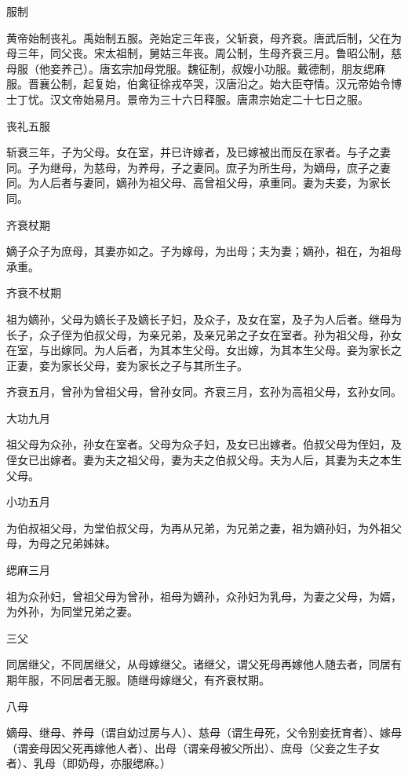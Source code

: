 \documentclass[a4paper,12pt,UTF8,twoside]{ctexbook}
\begin{document}
    服制
    
    黄帝始制丧礼。禹始制五服。尧始定三年丧，父斩衰，母齐衰。唐武后制，父在为母三年，同父丧。宋太祖制，舅姑三年丧。周公制，生母齐衰三月。鲁昭公制，慈母服（他妾养己）。唐玄宗加母党服。魏征制，叔嫂小功服。戴德制，朋友缌麻服。晋襄公制，起复始，伯禽征徐戎卒哭，汉唐沿之。始大臣夺情。汉元帝始令博士丁忧。汉文帝始易月。景帝为三十六日释服。唐肃宗始定二十七日之服。
    
    丧礼五服
    
    斩衰三年，子为父母。女在室，并已许嫁者，及已嫁被出而反在家者。与子之妻同。子为继母，为慈母，为养母，子之妻同。庶子为所生母，为嫡母，庶子之妻同。为人后者与妻同，嫡孙为祖父母、高曾祖父母，承重同。妻为夫妾，为家长同。
    
    齐衰杖期
    
    嫡子众子为庶母，其妻亦如之。子为嫁母，为出母；夫为妻；嫡孙，祖在，为祖母承重。
    
    齐衰不杖期
    
    祖为嫡孙，父母为嫡长子及嫡长子妇，及众子，及女在室，及子为人后者。继母为长子，众子侄为伯叔父母，为亲兄弟，及亲兄弟之子女在室者。孙为祖父母，孙女在室，与出嫁同。为人后者，为其本生父母。女出嫁，为其本生父母。妾为家长之正妻，妾为家长父母，妾为家长之子与其所生子。
    
    齐衰五月，曾孙为曾祖父母，曾孙女同。齐衰三月，玄孙为高祖父母，玄孙女同。
    
    大功九月
    
    祖父母为众孙，孙女在室者。父母为众子妇，及女已出嫁者。伯叔父母为侄妇，及侄女已出嫁者。妻为夫之祖父母，妻为夫之伯叔父母。夫为人后，其妻为夫之本生父母。
    
    小功五月
    
    为伯叔祖父母，为堂伯叔父母，为再从兄弟，为兄弟之妻，祖为嫡孙妇，为外祖父母，为母之兄弟姊妹。
    
    缌麻三月
    
    祖为众孙妇，曾祖父母为曾孙，祖母为嫡孙，众孙妇为乳母，为妻之父母，为婿，为外孙，为同堂兄弟之妻。
    
    三父
    
    同居继父，不同居继父，从母嫁继父。诸继父，谓父死母再嫁他人随去者，同居有期年服，不同居者无服。随继母嫁继父，有齐衰杖期。
    
    八母
    
    嫡母、继母、养母（谓自幼过房与人）、慈母（谓生母死，父令别妾抚育者）、嫁母（谓妾母因父死再嫁他人者）、出母（谓亲母被父所出）、庶母（父妾之生子女者）、乳母（即奶母，亦服缌麻。）
    
\end{document}
